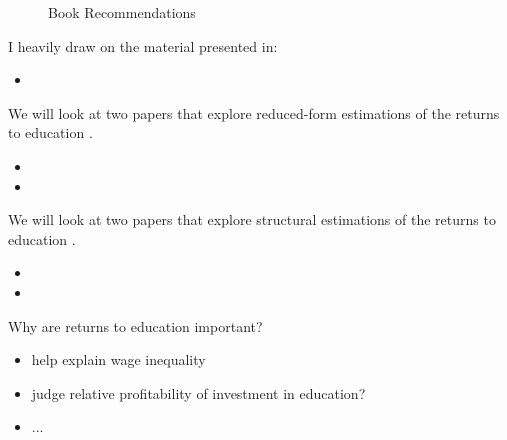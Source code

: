 \begin{frame}
\begin{figure}
\caption{Book Recommendations}
\hspace{0.5cm}
\end{figure}
\end{frame}

\maketitle

 \begin{frame}

 I heavily draw on the material presented in:

\begin{itemize}
\item {}
\end{itemize}

\end{frame}


 \begin{frame}
We will look at two papers that explore reduced-form estimations of the returns to education
.
\begin{itemize}
\item {}
\item {}
\end{itemize}
 \end{frame}

 \begin{frame}
We will look at two papers that explore structural estimations of the returns to education
.
\begin{itemize}
\item {}
\item {}
\end{itemize}
 \end{frame}


\begin{frame}
Why are returns to education important?
\begin{itemize}
\item help explain wage inequality
\item judge relative profitability of investment in education?
\item ...
\end{itemize}
\end{frame}

